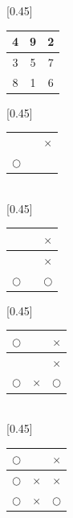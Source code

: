 \documentclass[UTF8]{article}
\begin{document}
\begin{figure}[htbp]
 \centering
 [0.45\linewidth]{
   \begin{tabular}{|c|c|c|}
   \hline
   4 & 9 & 2 \\
   \hline
   3 & 5 & 7 \\
   \hline
   8 & 1 & 6 \\
   \hline
   \end{tabular}
   \vspace{3mm}
 }
 [0.45\linewidth]{
   \begin{tabular}{c|c|c}
   &  & \\
   \hline
   &  & $\times$ \\
   \hline
   $\bigcirc$ & & \\
   \end{tabular}
   \vspace{3mm}
 } \vspace{3mm} \\
 [0.45\linewidth]{
   \begin{tabular}{c|c|c}
   &  & $\times$\\
   \hline
   &  & $\times$ \\
   \hline
   $\bigcirc$ & & $\bigcirc$ \\
   \end{tabular}
   \vspace{3mm}
 }
 [0.45\linewidth]{
   \begin{tabular}{c|c|c}
   $\bigcirc$ &  & $\times$\\
   \hline
   &  & $\times$ \\
   \hline
   $\bigcirc$ & $\times$ & $\bigcirc$ \\
   \end{tabular}
   \vspace{3mm}
 } \vspace{3mm} \\
 [0.45\linewidth]{
   \begin{tabular}{c|c|c}
   $\pmb{\bigcirc}$ &  & $\times$\\
   \hline
   $\pmb{\bigcirc}$ &  $\times$ & $\times$ \\
   \hline
   $\pmb{\bigcirc}$ & $\times$ & $\bigcirc$ \\
   \end{tabular}
   \vspace{3mm}
 }
 \captionsetup{labelformat=empty}
 \caption{}
 \label{fig:game-steps}
\end{figure}
\end{document}

